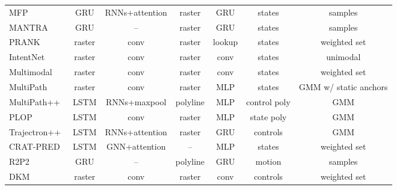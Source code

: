 \begin{table}[h!]
\begin{adjustbox}{max width=\textwidth}
\begin{tabular}{l |ccc|c|c|c}
			MFP~\cite{tang2019multiple}	& GRU	& RNNs+attention	& raster	& GRU	& states	& samples	\\
			MANTRA~\cite{marchetti2020mantra}	& GRU	& --	& raster	& GRU	& states	& samples	\\
			PRANK~\cite{biktairov2020prank}	& raster	& conv	& raster	& lookup	& states	& weighted set	\\
			IntentNet~\cite{casas2018intentnet}	& raster	& conv	& raster	& conv	& states	& unimodal	\\
			Multimodal~\cite{cui2019multimodal}	& raster	& conv	& raster	& conv	& states	& weighted set	\\
			MultiPath~\cite{chai2019multipath}	& raster	& conv	& raster	& MLP	& states	& GMM w/ static anchors	\\
			MultiPath++~\cite{varadarajan2022multipath++}	& LSTM	& RNNs+maxpool	& polyline	& MLP	& control poly	& GMM	\\
			PLOP~\cite{buhet2021plop}	& LSTM	& conv	& raster	& MLP	& state poly	& GMM	\\
			Trajectron++\cite{salzmann2020trajectron++}	& LSTM	& RNNs+attention	& raster	& GRU	& controls	& GMM	\\
			CRAT-PRED\cite{schmidt2022crat}	& LSTM	& GNN+attention	& --	& MLP	& states	& weighted set	\\
			R2P2~\cite{rhinehart2018r2p2}	& GRU	& --	& polyline	& GRU	& motion	& samples	\\
			DKM~\cite{cui2020deep}	& raster	& conv	& raster	& conv	& controls	& weighted set	\\
		\end{tabular}
		\label{table:related_work}
	\end{adjustbox}
\end{table}

